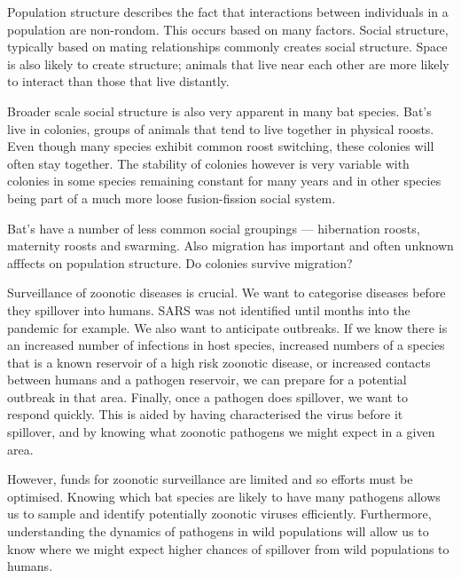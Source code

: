 Population structure describes the fact that interactions between individuals in a population are non-rondom.
This occurs based on many factors.
Social structure, typically based on mating relationships commonly creates social structure.
Space is also likely to create structure; animals that live near each other are more likely to interact than those that live distantly.

Broader scale social structure is also very apparent in many bat species.
Bat's live in colonies, groups of animals that tend to live together in physical roosts.
Even though many species exhibit common roost switching, these colonies will often stay together.
The stability of colonies however is very variable with colonies in some species remaining constant for many years and in other species being part of a much more loose fusion-fission social system.

Bat's have a number of less common social groupings --- hibernation roosts, maternity roosts and swarming.
Also migration has important and often unknown afffects on population structure.
Do colonies survive migration?







Surveillance of zoonotic diseases is crucial.
We want to categorise diseases before they spillover into humans. 
SARS was not identified until months into the pandemic for example.
We also want to anticipate outbreaks.
If we know there is an increased number of infections in host species, increased numbers of a species that is a known reservoir of a high risk zoonotic disease, or increased contacts between humans and a pathogen reservoir, we can prepare for a potential outbreak in that area.
Finally, once a pathogen does spillover, we want to respond quickly.
This is aided by having characterised the virus before it spillover, and by knowing what zoonotic pathogens we might expect in a given area.

However, funds for zoonotic surveillance are limited and so efforts must be optimised.
Knowing which bat species are likely to have many pathogens allows us to sample and identify potentially zoonotic viruses efficiently.
Furthermore, understanding the dynamics of pathogens in wild populations will allow us to know where we might expect higher chances of spillover from wild populations to humans.





